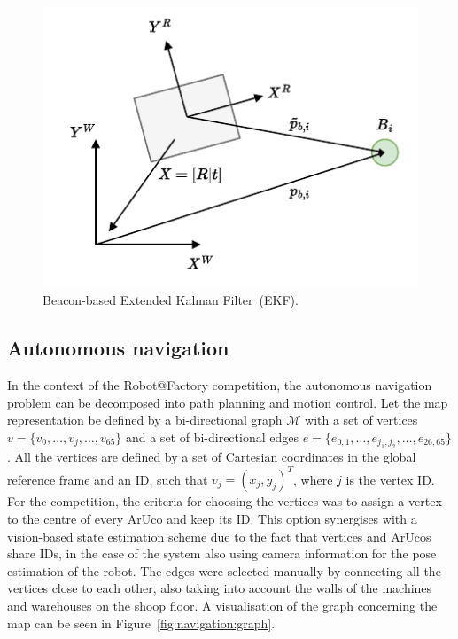 \documentclass[conference]{IEEEtran}
\begin{document}
\begin{figure}[!t]
\centering
\centerline{\includegraphics[width=0.8\columnwidth]{figures/localisation.pdf}}
\caption{Beacon-based Extended Kalman Filter~(EKF).}
\label{fig:localisation}
\end{figure}




\subsection{Autonomous navigation}

In the context of the Robot@Factory competition, the autonomous navigation problem can be decomposed into path planning and motion control.
Let the map representation be defined by a bi-directional graph $\mathcal{M}$ with a set of vertices $v=\{v_0,\dots,v_{j},\dots,v_{65}\}$ and a set of bi-directional edges $e=\{e_{0,1},\dots,e_{j_1,j_2},\dots,e_{26,65}\}$.
All the vertices are defined by a set of Cartesian coordinates in the global reference frame and an ID, such that $v_j=(x_j,y_j)^T$, where $j$ is the vertex ID.
For the competition, the criteria for choosing the vertices was to assign a vertex to the centre of every ArUco and keep its ID.
This option synergises with a vision-based state estimation scheme due to the fact that vertices and ArUcos share IDs, in the case of the system also using camera information for the pose estimation of the robot.
The edges were selected manually by connecting all the vertices close to each other, also taking into account the walls of the machines and warehouses on the shoop floor.
A visualisation of the graph concerning the map can be seen in Figure~\ref{fig:navigation:graph}.
\end{document}
